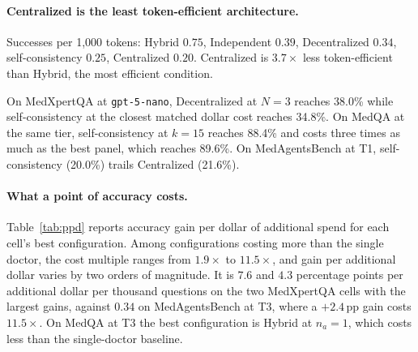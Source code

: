 \paragraph{Centralized is the least token-efficient architecture.}
Successes per 1{,}000 tokens: Hybrid $0.75$, Independent $0.39$, Decentralized $0.34$,
self-consistency $0.25$, Centralized $0.20$. Centralized is $3.7\times$ less token-efficient than
Hybrid, the most efficient condition.


On MedXpertQA at \texttt{gpt-5-nano}, Decentralized at $N{=}3$ reaches 38.0\% while
self-consistency at the closest matched dollar cost reaches 34.8\%. On MedQA at the same tier,
self-consistency at $k{=}15$ reaches 88.4\% and costs three times as much as the best panel,
which reaches 89.6\%. On MedAgentsBench at T1, self-consistency (20.0\%) trails Centralized (21.6\%).

\paragraph{What a point of accuracy costs.}
Table~\ref{tab:ppd} reports accuracy gain per dollar of additional spend
for each cell's best configuration. Among configurations costing more than the single doctor,
the cost multiple ranges from $1.9\times$ to $11.5\times$, and gain per additional dollar varies
by two orders of magnitude. It is
$7.6$ and $4.3$ percentage points per additional dollar per thousand questions on the two
MedXpertQA cells with the largest gains, against $0.34$ on MedAgentsBench at T3, where a
$+2.4$\,pp gain costs $11.5\times$. On MedQA at T3 the best configuration is Hybrid at $n_a{=}1$,
which costs less than the single-doctor baseline.

